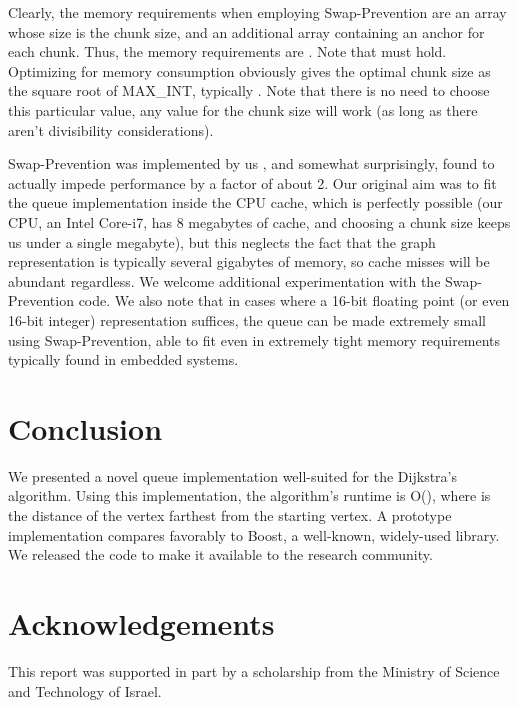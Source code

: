 \documentclass[conference,10pt,twocolumn]{IEEEtran}
\begin{document}
Clearly, the memory requirements when employing Swap-Prevention are an array whose size is the chunk size, and an additional array containing an anchor for each chunk. Thus, the memory requirements are . Note that  must hold. Optimizing for memory consumption obviously gives the optimal chunk size as the square root of MAX\_INT, typically . Note that there is no need to choose this particular value, any value for the chunk size will work (as long as there aren't divisibility considerations).

Swap-Prevention was implemented by us \cite{Swap-Prevention-Commit}, and somewhat surprisingly, found to actually impede performance by a factor of about 2. Our original aim was to fit the queue implementation inside the CPU cache, which is perfectly possible (our CPU, an Intel Core-i7, has 8 megabytes of cache, and choosing a  chunk size keeps us under a single megabyte), but this neglects the fact that the graph representation is typically several gigabytes of memory, so cache misses will be abundant regardless. We welcome additional experimentation with the Swap-Prevention code. We also note that in cases where a 16-bit floating point (or even 16-bit integer) representation suffices, the queue can be made extremely small using Swap-Prevention, able to fit even in extremely tight memory requirements typically found in embedded systems. 

\section{Conclusion} \label{sec:cncld}
We presented a novel queue implementation well-suited for the Dijkstra's algorithm. Using this implementation, the algorithm's runtime is O(), where  is the distance of the vertex farthest from the starting vertex. A prototype implementation compares favorably to Boost, a well-known, widely-used library. We released the code to make it available to the research community.



\section*{Acknowledgements}
This report was supported in part by a scholarship from the Ministry of Science and Technology of Israel.



\end{document}
